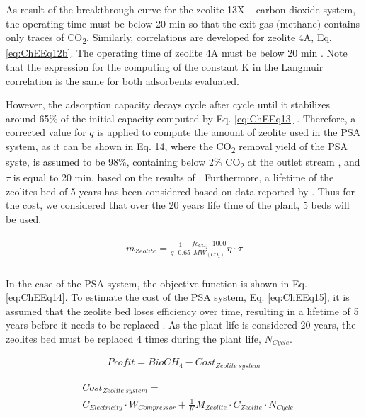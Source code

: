 \begin{refsection}[referencesCh7]
As result of the breakthrough curve for the zeolite 13X – carbon dioxide system, the operating time must be below 20 min so that the exit gas (methane) contains only traces of CO\textsubscript{2}. Similarly, correlations are developed for zeolite 4A, Eq. \ref{eq:ChEEq12b}. The operating time of zeolite 4A must be below 20 min \citep{hauchhum2014carbon}. Note that the expression for the computing of the constant K in the Langmuir correlation is the same for both adsorbents evaluated.

However, the adsorption capacity decays cycle after cycle until it stabilizes around 65\% of the initial capacity computed by Eq. \ref{eq:ChEEq13} \citep{hauchhum2014carbon}. Therefore, a corrected value for $q$ is applied to compute the amount of zeolite used in the PSA system, as it can be shown in Eq. 14, where the CO\textsubscript{2} removal yield of the PSA syste, is assumed to be 98\%, containing below 2\% CO\textsubscript{2} at the outlet stream \citep{ferella2017separation}, and $\tau$ is equal to 20 min, based on the results of \citep{hauchhum2014carbon}. Furthermore, a lifetime of the zeolites bed of 5 years has been considered based on data reported by \citet{Xiao2013}. Thus for the cost, we considered that over the 20 years life time of the plant, 5 beds will be used.

\begin{align}
\begin{array}{l}{m_{Zeolite}} = \frac{1}{{q\cdot0.65}}\frac{{f{c_{C{O_2}}}\cdot1000}}{{M{W_{(C{O_2})}}}}\eta \cdot\tau \\\end{array} \label{eq:ChEEq13}
\end{align}

In the case of the PSA system, the objective function is shown in Eq. \ref{eq:ChEEq14}. To estimate the cost of the PSA system, Eq. \ref{eq:ChEEq15}, it is assumed that the zeolite bed loses efficiency over time, resulting in a lifetime of 5 years before it needs to be replaced \citep{Xiao2013}. As the plant life is considered 20 years, the zeolites bed must be replaced 4 times during the plant life, $N_{Cycle}$. 

\begin{align}
Profit = BioCH_{4} - Cost_{Zeolite \ system} \label{eq:ChEEq14}
\end{align}

\begin{align}
&Cost_{Zeolite \ system} = \label{eq:ChEEq15}\\
&C_{Electricity} \cdot W_{Compressor} + \frac{1}{K}{M_{Zeolite}} \cdot {C_{Zeolite}}\cdot{N_{Cycle}} \nonumber
\end{align}


\end{refsection}
